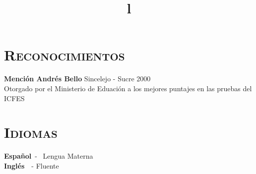 \begin{resume}

\section{\textsc{Reconocimientos}}
\textbf{Menci\'{o}n Andr\'{e}s Bello} \hfill  Sincelejo - Sucre 2000  \\
Otorgado por el Ministerio de Eduaci\'{o}n a los mejores puntajes en
las pruebas del ICFES \hfill \\

\section{\textsc{Idiomas}}
\textbf{Espa\~{n}ol}\   - \  Lengua Materna \\
\textbf{Ingl\'{e}s}\ \  -  Fluente




\begin{formatb}
  \title{l}\\
 \\
  \body\\
\end{formatb}


\end{resume}
